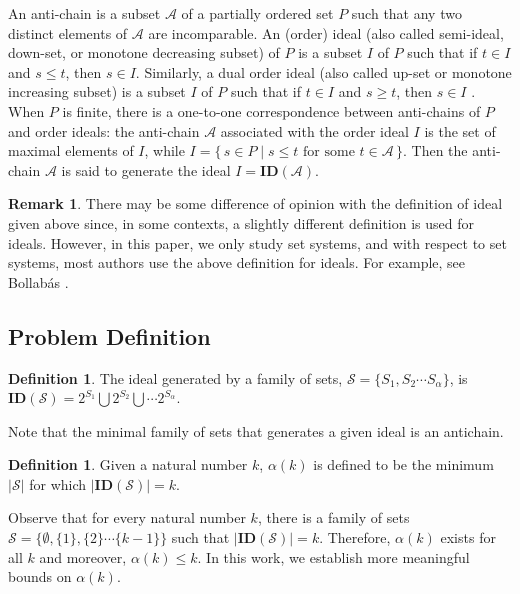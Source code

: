 \documentclass[11pt,a4paper]{article}
\theoremstyle{definition}
\newtheorem{definition}[theorem]{Definition}
\newtheorem{remark}[theorem]{Remark}
\begin{document}
An anti-chain is a subset $\mathcal{A}$ of a partially 
ordered set $P$ such that any two distinct elements of 
$\mathcal{A}$ are incomparable. An (order) ideal (also 
called semi-ideal, down-set, or monotone decreasing subset) 
of $P$ is a subset $I$ of $P$ such that if $t \in I$ and 
$s \leq t$, then $s \in I$. Similarly, a dual order ideal 
(also called up-set or monotone increasing subset) is a 
subset $I$ of $P$ such that if $t \in I$ and $s \geq t$, 
then $s \in I$ \cite{stanley}. When $P$ is finite, there is 
a one-to-one correspondence between anti-chains of $P$ and 
order ideals: the anti-chain $\mathcal{A}$ associated with 
the order ideal $I$ is the set of maximal elements of $I$, 
while $I = \{\, s \in P \mid s \leq t \text{ for some } 
t \in \mathcal{A} \,\}$. Then the anti-chain $\mathcal{A}$ 
is said to generate the ideal $I=\mathbf{ID}(\mathcal{A})$.

\begin{remark}
	There may be some difference of opinion with the definition 
	of ideal given above since, in some contexts, a slightly 
	different definition is used for ideals. However, in this 
	paper, we only study set systems, and with respect to set 
	systems, most authors use the above definition for ideals. 
	For example, see Bollab\'as \cite{bollobasbook}.
\end{remark}

\subsection{Problem Definition}
\begin{definition}
	The ideal generated by a family of sets, 
	$\mathcal{S}=\{S_1, S_2\cdots S_\alpha \}$, is 
	$\mathbf{ID}(\mathcal{S}) = 2^{S_1} \bigcup 2^{S_2} 
	\bigcup \cdots 2^{S_\alpha}$. 
\end{definition}
Note that the minimal family 
	of sets that generates a given ideal is an antichain. 
\begin{definition}
	Given a natural number $k$, $\alpha(k)$ is defined to be 
	the minimum $|\mathcal{S}|$ for which 
	$|\mathbf{ID}(\mathcal{S})|=k$.
\end{definition}

Observe that for every natural number $k$, there is a family 
of sets $\mathcal{S}=\{\emptyset, \{1\},\{2\}\cdots \{k-1\}\}$ 
such that $|\mathbf{ID}(\mathcal{S})|=k$. Therefore, 
$\alpha(k)$ exists for all $k$ and moreover, $\alpha(k) \leq k$. 
In this work, we establish more meaningful bounds on $\alpha(k)$.
\end{document}
